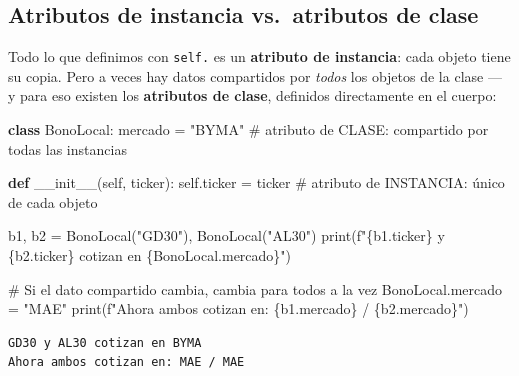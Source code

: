 \documentclass[
  spanish,
  letterpaper,
  DIV=11,
  numbers=noendperiod]{scrreprt}
\newenvironment{Shaded}{\begin{snugshade}}{\end{snugshade}}
\newcommand{\BuiltInTok}[1]{\textcolor[rgb]{0.00,0.23,0.31}{#1}}
\newcommand{\CommentTok}[1]{\textcolor[rgb]{0.37,0.37,0.37}{#1}}
\newcommand{\FunctionTok}[1]{\textcolor[rgb]{0.28,0.35,0.67}{#1}}
\newcommand{\KeywordTok}[1]{\textcolor[rgb]{0.00,0.23,0.31}{\textbf{#1}}}
\newcommand{\NormalTok}[1]{\textcolor[rgb]{0.00,0.23,0.31}{#1}}
\newcommand{\OperatorTok}[1]{\textcolor[rgb]{0.37,0.37,0.37}{#1}}
\newcommand{\SpecialCharTok}[1]{\textcolor[rgb]{0.37,0.37,0.37}{#1}}
\newcommand{\SpecialStringTok}[1]{\textcolor[rgb]{0.13,0.47,0.30}{#1}}
\newcommand{\StringTok}[1]{\textcolor[rgb]{0.13,0.47,0.30}{#1}}
\newcommand{\VariableTok}[1]{\textcolor[rgb]{0.07,0.07,0.07}{#1}}
\begin{document}
\subsection{Atributos de instancia vs.~atributos de
clase}\label{atributos-de-instancia-vs.-atributos-de-clase}

Todo lo que definimos con \texttt{self.} es un \textbf{atributo de
instancia}: cada objeto tiene su copia. Pero a veces hay datos
compartidos por \emph{todos} los objetos de la clase --- y para eso
existen los \textbf{atributos de clase}, definidos directamente en el
cuerpo:

\label{atributos-clase}
\begin{Shaded}
\begin{Highlighting}[]
\KeywordTok{class}\NormalTok{ BonoLocal:}
\NormalTok{    mercado }\OperatorTok{=} \StringTok{"BYMA"}   \CommentTok{\# atributo de CLASE: compartido por todas las instancias}

    \KeywordTok{def} \FunctionTok{\_\_init\_\_}\NormalTok{(}\VariableTok{self}\NormalTok{, ticker):}
        \VariableTok{self}\NormalTok{.ticker }\OperatorTok{=}\NormalTok{ ticker   }\CommentTok{\# atributo de INSTANCIA: único de cada objeto}

\NormalTok{b1, b2 }\OperatorTok{=}\NormalTok{ BonoLocal(}\StringTok{"GD30"}\NormalTok{), BonoLocal(}\StringTok{"AL30"}\NormalTok{)}
\BuiltInTok{print}\NormalTok{(}\SpecialStringTok{f"}\SpecialCharTok{\{}\NormalTok{b1}\SpecialCharTok{.}\NormalTok{ticker}\SpecialCharTok{\}}\SpecialStringTok{ y }\SpecialCharTok{\{}\NormalTok{b2}\SpecialCharTok{.}\NormalTok{ticker}\SpecialCharTok{\}}\SpecialStringTok{ cotizan en }\SpecialCharTok{\{}\NormalTok{BonoLocal}\SpecialCharTok{.}\NormalTok{mercado}\SpecialCharTok{\}}\SpecialStringTok{"}\NormalTok{)}

\CommentTok{\# Si el dato compartido cambia, cambia para todos a la vez}
\NormalTok{BonoLocal.mercado }\OperatorTok{=} \StringTok{"MAE"}
\BuiltInTok{print}\NormalTok{(}\SpecialStringTok{f"Ahora ambos cotizan en: }\SpecialCharTok{\{}\NormalTok{b1}\SpecialCharTok{.}\NormalTok{mercado}\SpecialCharTok{\}}\SpecialStringTok{ / }\SpecialCharTok{\{}\NormalTok{b2}\SpecialCharTok{.}\NormalTok{mercado}\SpecialCharTok{\}}\SpecialStringTok{"}\NormalTok{)}
\end{Highlighting}
\end{Shaded}

\begin{verbatim}
GD30 y AL30 cotizan en BYMA
Ahora ambos cotizan en: MAE / MAE
\end{verbatim}
\end{document}
